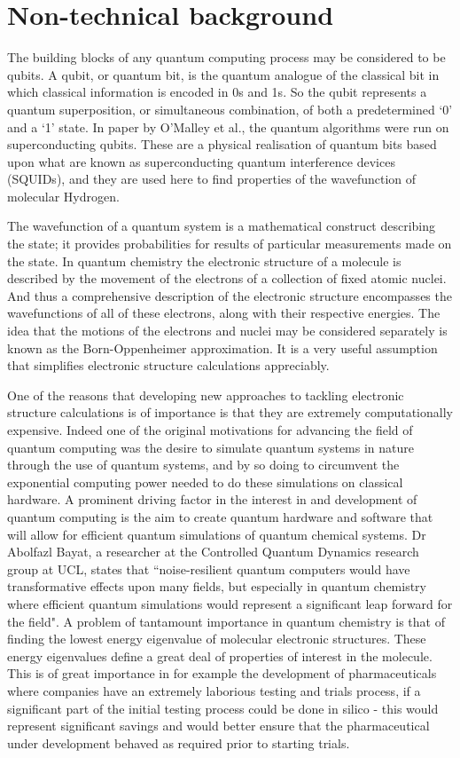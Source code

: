\documentclass[12pt]{article}
\begin{document}
\section{Non-technical background}

The building blocks of any quantum computing process may be considered to be qubits. A qubit, or quantum bit, is the quantum analogue of the
classical bit in which classical information is encoded in 0s and 1s. So the qubit represents a quantum superposition, or simultaneous combination, of
both a predetermined `0’ and a `1’ state. In paper by O’Malley et al., the quantum algorithms were run on superconducting qubits. These are a
physical realisation of quantum bits based upon what are known as superconducting quantum interference devices (SQUIDs), and they are used here
to find properties of the wavefunction of molecular Hydrogen.

The wavefunction of a quantum system is a mathematical construct describing the state; it provides probabilities for results of particular measurements
 made on the state. In quantum chemistry the electronic structure of a molecule is described by the movement of the electrons of a collection of fixed
  atomic nuclei. And thus a comprehensive description of the electronic structure encompasses the wavefunctions of all of these electrons, along with
  their respective energies. The idea that the motions of the electrons and nuclei may be considered separately is known as the Born-Oppenheimer
  approximation. It is a very useful assumption that simplifies electronic structure calculations appreciably.

One of the reasons that developing new approaches to tackling electronic structure calculations is of importance is that they are extremely
computationally expensive. Indeed one of the original motivations for advancing the field of quantum computing was the desire to simulate quantum
 systems in nature through the use of quantum systems, and by so doing to circumvent the exponential computing power needed to do these simulations
 on classical hardware. A prominent driving factor in the interest in and development of quantum computing is the aim to create quantum hardware
 and software that will allow for efficient quantum simulations of quantum chemical systems. Dr Abolfazl Bayat, a researcher at the Controlled
 Quantum Dynamics research group at UCL, states that ``noise-resilient quantum computers would have transformative effects upon many fields,
 but especially in quantum chemistry where efficient quantum simulations would represent a significant leap forward for the field". A problem of
 tantamount importance in quantum chemistry is that of finding the lowest energy eigenvalue of molecular electronic structures. These energy
 eigenvalues define a great deal of properties of interest in the molecule. This is of great importance in for example the development of
 pharmaceuticals where companies have an extremely laborious testing and trials process, if a significant part of the initial testing process
 could be done in silico - this would represent significant savings and would better ensure that the pharmaceutical under development behaved as
 required prior to starting trials.
\end{document}
